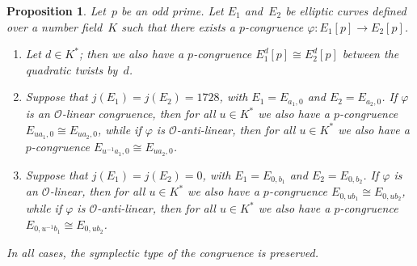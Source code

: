 \documentclass[12pt, reqno]{amsart}
\newcommand{\calO}{\mathcal{O}}
\numberwithin{equation}{section}
\newtheorem{proposition}[theorem]{Proposition}
\theoremstyle{definition}
\theoremstyle{remark}
\begin{document}
\begin{proposition}\label{P:twist-cong}
Let~$p$ be an odd prime.  Let $E_1$ and~$E_2$ be elliptic curves
defined over a number field~$K$ such that there exists a
$p$-congruence $\varphi:E_1[p]\to E_2[p]$.
\begin{enumerate}
\item
  Let $d\in K^*$; then we also have a $p$-congruence $E_1^d[p]\cong
  E_2^d[p]$ between the quadratic twists by~$d$.
\item
  Suppose that $j(E_1)=j(E_2)=1728$, with $E_1=E_{a_1,0}$ and
  $E_2=E_{a_2,0}$.  If $\varphi$ is an $\calO$-linear congruence, then
  for all $u\in K^*$ we also have a $p$-congruence $E_{ua_1,0}\cong
  E_{ua_2,0}$, while if $\varphi$ is $\calO$-anti-linear, then for all
  $u\in K^*$ we also have a $p$-congruence $E_{u^{-1}a_1,0}\cong
  E_{ua_2,0}$.
\item
  Suppose that $j(E_1)=j(E_2)=0$, with $E_1=E_{0,b_1}$ and
  $E_2=E_{0,b_2}$.  If $\varphi$ is an $\calO$-linear, then for all
  $u\in K^*$ we also have a $p$-congruence $E_{0,ub_1}\cong
  E_{0,ub_2}$, while if $\varphi$ is $\calO$-anti-linear, then for all
  $u\in K^*$ we also have a $p$-congruence $E_{0,u^{-1}b_1}\cong
  E_{0,ub_2}$.
\end{enumerate}
In all cases, the symplectic type of the congruence is preserved.
\end{proposition}
\end{document}
